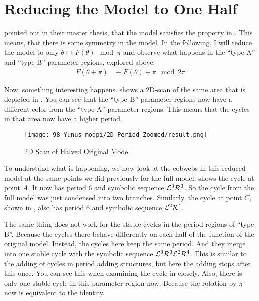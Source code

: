 \section{Reducing the Model to One Half}

 pointed out in their master thesis, that the model satisfies the property in .
This means, that there is some symmetry in the model.
In the following, I will reduce the model to only $\theta \mapsto F(\theta) \mod \pi$ and observe what happens in the ``type A'' and ``type B'' parameter regions, explored above.
\begin{align}
    F(\theta + \pi) & \equiv F(\theta) + \pi \mod 2 \pi \label{equ:yunus.property.symmetry}
\end{align}

Now, something interesting happens.
 shows a 2D-scan of the same area that is depicted in .
You can see that the ``type B'' parameter regions now have a different color from the ``type A'' parameter regions.
This means that the cycles in that area now have a higher period.

\begin{figure}
    \centering
    \texttt{[image: 98\_Yunus\_modpi/2D\_Period\_Zoomed/result.png]}
    \caption{2D Scan of Halved Original Model}
    \label{fig:yunus.pi.2d.full}
\end{figure}

To understand what is happening, we now look at the cobwebs in this reduced model at the same points we did previously for the full model.
 shows the cycle at point $A$.
It now has period 6 and symbolic sequence $\mathcal{L}^3\mathcal{R}^3$.
So the cycle from the full model was just condensed into two branches.
Similarly, the cycle at point $C$, shown in , also has period 6 and symbolic sequence $\mathcal{L}^2\mathcal{R}^4$.

The same thing does not work for the stable cycles in the period regions of ``type B''.
Because the cycles there behave differently on each half of the function of the original model.
Instead, the cycles here keep the same period.
And they merge into one stable cycle with the symbolic sequence $\mathcal{L}^3\mathcal{R}^3\mathcal{L}^2\mathcal{R}^4$.
This is similar to the adding of cycles in period adding structures, but here the adding stops after this once.
You can see this when examining the cycle in  closely.
Also, there is only one stable cycle in this parameter region now.
Because the rotation by $\pi$ now is equivalent to the identity.

